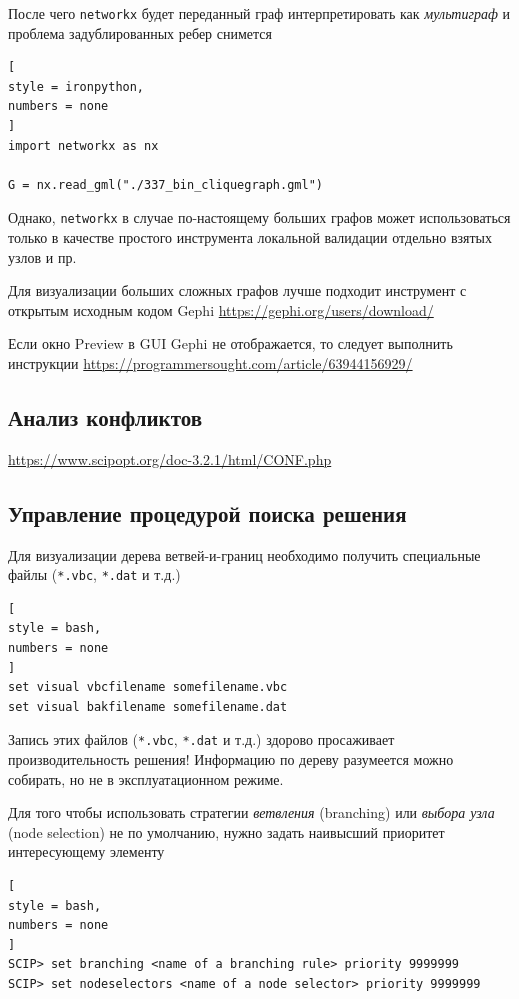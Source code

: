 \documentclass[%
	11pt,
	a4paper,
	utf8,
		]{article}
\begin{document}
После чего \verb|networkx| будет переданный граф интерпретировать как \emph{мультиграф} и проблема задублированных ребер снимется

\begin{lstlisting}[
style = ironpython,
numbers = none	
]
import networkx as nx

G = nx.read_gml("./337_bin_cliquegraph.gml")
\end{lstlisting}

Однако, \verb|networkx| в случае по-настоящему больших графов может использоваться только в качестве простого инструмента локальной валидации отдельно взятых узлов и пр.

Для визуализации больших сложных графов лучше подходит инструмент с открытым исходным кодом Gephi \url{https://gephi.org/users/download/}

Если окно Preview в GUI Gephi не отображается, то следует выполнить инструкции \url{https://programmersought.com/article/63944156929/}

\subsection{Анализ конфликтов}

\url{https://www.scipopt.org/doc-3.2.1/html/CONF.php}

\subsection{Управление процедурой поиска решения}

Для визуализации дерева ветвей-и-границ необходимо получить специальные файлы (\verb*|*.vbc|, \verb|*.dat| и т.д.)
\begin{lstlisting}[
style = bash,
numbers = none
]
set visual vbcfilename somefilename.vbc
set visual bakfilename somefilename.dat
\end{lstlisting}

{\color{red} Запись этих файлов (\verb|*.vbc|, \verb|*.dat| и т.д.) здорово просаживает производительность решения! Информацию по дереву разумеется можно собирать, но не в эксплуатационном режиме.
}

Для того чтобы использовать стратегии \emph{ветвления} (branching) или \emph{выбора узла} (node selection) не по умолчанию, нужно задать наивысший приоритет интересующему элементу
\begin{lstlisting}[
style = bash,
numbers = none
]
SCIP> set branching <name of a branching rule> priority 9999999
SCIP> set nodeselectors <name of a node selector> priority 9999999
\end{lstlisting}
\end{document}
